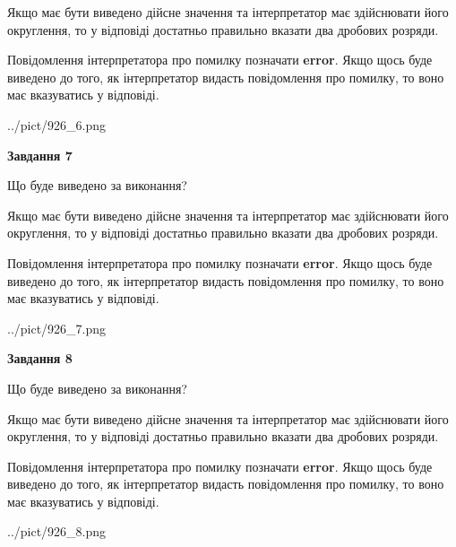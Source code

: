 \documentclass[12pt, ukrainian]{article}
\begin{document}
{\begin {Large}
Якщо має бути виведено дійсне значення та інтерпретатор має здійснювати його округлення, 
то у відповіді достатньо правильно вказати два дробових розряди.

Повідомлення інтерпретатора про помилку позначати \textbf{error}.
Якщо щось буде виведено до того, як інтерпретатор видасть повідомлення про помилку, 
то воно має вказуватись у відповіді. \par

\begin{center}
	{../pict/926_6.png}
\end{center}
\newpage

{\begin {center}\textbf{Завдання 7}\end {center}}\par
Що буде виведено за виконання? \par

Якщо має бути виведено дійсне значення та інтерпретатор має здійснювати його округлення, 
то у відповіді достатньо правильно вказати два дробових розряди.

Повідомлення інтерпретатора про помилку позначати \textbf{error}.
Якщо щось буде виведено до того, як інтерпретатор видасть повідомлення про помилку, 
то воно має вказуватись у відповіді. \par

\begin{center}
	{../pict/926_7.png}
\end{center}
\newpage

{\begin {center}\textbf{Завдання 8}\end {center}}\par
Що буде виведено за виконання? \par

Якщо має бути виведено дійсне значення та інтерпретатор має здійснювати його округлення, 
то у відповіді достатньо правильно вказати два дробових розряди.

Повідомлення інтерпретатора про помилку позначати \textbf{error}.
Якщо щось буде виведено до того, як інтерпретатор видасть повідомлення про помилку, 
то воно має вказуватись у відповіді. \par

\begin{center}
	{../pict/926_8.png}
\end{center}
\newpage


\end{Large}}
\end{document}
